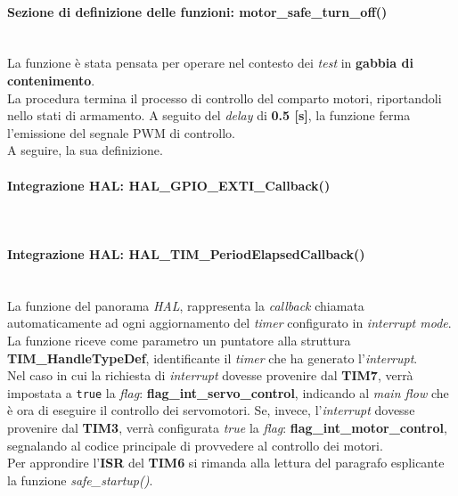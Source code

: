 \paragraph{Sezione di definizione delle funzioni: motor\_safe\_turn\_off()}\mbox{}\\
La funzione è stata pensata per operare nel contesto dei \textit{test} in \textbf{gabbia di contenimento}.\\
La procedura termina il processo di controllo del comparto motori, riportandoli nello stati di armamento. A seguito del \textit{delay} di \textbf{0.5 [s]}, la funzione ferma l'emissione del segnale PWM di controllo.\\
A seguire, la sua definizione.\\


\paragraph{Integrazione HAL: HAL\_GPIO\_EXTI\_Callback()}\mbox{}\\



\paragraph{Integrazione HAL: HAL\_TIM\_PeriodElapsedCallback()}\mbox{}\\
La funzione del panorama \textit{HAL}, rappresenta la \textit{callback} chiamata automaticamente ad ogni aggiornamento del \textit{timer} configurato in \textit{interrupt mode}.\\
La funzione riceve come parametro un puntatore alla struttura \textbf{TIM\_HandleTypeDef}, identificante il \textit{timer} che ha generato l'\textit{interrupt}.\\
Nel caso in cui la richiesta di \textit{interrupt} dovesse provenire dal \textbf{TIM7}, verrà impostata a \texttt{true} la \textit{flag}: \textbf{flag\_int\_servo\_control}, indicando al \textit{main flow} che è ora di eseguire il controllo dei servomotori.
Se, invece, l'\textit{interrupt} dovesse provenire dal \textbf{TIM3}, verrà configurata \textit{true} la \textit{flag}: \textbf{flag\_int\_motor\_control}, segnalando al codice principale di provvedere al controllo dei motori.\\
Per approndire l'\textbf{ISR} del \textbf{TIM6} si rimanda alla lettura del paragrafo esplicante la funzione \textit{safe\_startup()}.


